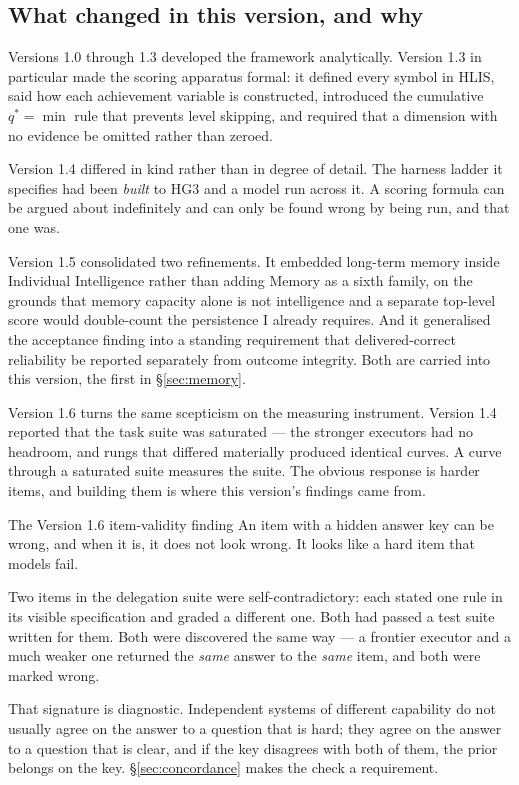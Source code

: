 \documentclass[11pt]{article}
\theoremstyle{definition}
\begin{document}
\subsection{What changed in this version, and why}

Versions 1.0 through 1.3 developed the framework analytically. Version 1.3 in particular made the scoring apparatus formal: it defined every symbol in HLIS, said how each achievement variable is constructed, introduced the cumulative $q^{*}=\min$ rule that prevents level skipping, and required that a dimension with no evidence be omitted rather than zeroed.

Version 1.4 differed in kind rather than in degree of detail. The harness ladder it specifies had been \emph{built} to HG3 and a model run across it. A scoring formula can be argued about indefinitely and can only be found wrong by being run, and that one was.

Version 1.5 consolidated two refinements. It embedded long-term memory inside Individual Intelligence rather than adding Memory as a sixth family, on the grounds that memory capacity alone is not intelligence and a separate top-level score would double-count the persistence I already requires. And it generalised the acceptance finding into a standing requirement that delivered-correct reliability be reported separately from outcome integrity. Both are carried into this version, the first in \S\ref{sec:memory}.

Version 1.6 turns the same scepticism on the measuring instrument. Version 1.4 reported that the task suite was saturated --- the stronger executors had no headroom, and rungs that differed materially produced identical curves. A curve through a saturated suite measures the suite. The obvious response is harder items, and building them is where this version's findings came from.

\begin{cautionbox}{The Version 1.6 item-validity finding}
An item with a hidden answer key can be wrong, and when it is, it does not look wrong. It looks like a hard item that models fail.

Two items in the delegation suite were self-contradictory: each stated one rule in its visible specification and graded a different one. Both had passed a test suite written for them. Both were discovered the same way --- a frontier executor and a much weaker one returned the \emph{same} answer to the \emph{same} item, and both were marked wrong.

That signature is diagnostic. Independent systems of different capability do not usually agree on the answer to a question that is hard; they agree on the answer to a question that is clear, and if the key disagrees with both of them, the prior belongs on the key. \S\ref{sec:concordance} makes the check a requirement.
\end{cautionbox}
\end{document}
